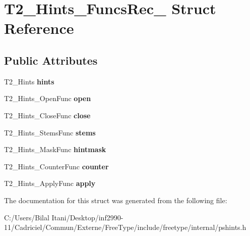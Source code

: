 \hypertarget{struct_t2___hints___funcs_rec__}{}\section{T2\+\_\+\+Hints\+\_\+\+Funcs\+Rec\+\_\+ Struct Reference}
\label{struct_t2___hints___funcs_rec__}
\subsection*{Public Attributes}
\begin{DoxyCompactItemize}
\item 
T2\+\_\+\+Hints {\bfseries hints}\hypertarget{struct_t2___hints___funcs_rec___af8daab694889bede5a513fbae5f86e25}{}\label{struct_t2___hints___funcs_rec___af8daab694889bede5a513fbae5f86e25}

\item 
T2\+\_\+\+Hints\+\_\+\+Open\+Func {\bfseries open}\hypertarget{struct_t2___hints___funcs_rec___a1a5e0b296ee2e2ae6711b3ee35e5fcd9}{}\label{struct_t2___hints___funcs_rec___a1a5e0b296ee2e2ae6711b3ee35e5fcd9}

\item 
T2\+\_\+\+Hints\+\_\+\+Close\+Func {\bfseries close}\hypertarget{struct_t2___hints___funcs_rec___a7e50e26fd55254044bc9f2ba62574352}{}\label{struct_t2___hints___funcs_rec___a7e50e26fd55254044bc9f2ba62574352}

\item 
T2\+\_\+\+Hints\+\_\+\+Stems\+Func {\bfseries stems}\hypertarget{struct_t2___hints___funcs_rec___a12bfd8bae5d3df8f570fcdfb70c00139}{}\label{struct_t2___hints___funcs_rec___a12bfd8bae5d3df8f570fcdfb70c00139}

\item 
T2\+\_\+\+Hints\+\_\+\+Mask\+Func {\bfseries hintmask}\hypertarget{struct_t2___hints___funcs_rec___af50d0cadda7033d7dbd27a199ccfcdd4}{}\label{struct_t2___hints___funcs_rec___af50d0cadda7033d7dbd27a199ccfcdd4}

\item 
T2\+\_\+\+Hints\+\_\+\+Counter\+Func {\bfseries counter}\hypertarget{struct_t2___hints___funcs_rec___ad9d856a64b4a8556fc8d74bae1779e11}{}\label{struct_t2___hints___funcs_rec___ad9d856a64b4a8556fc8d74bae1779e11}

\item 
T2\+\_\+\+Hints\+\_\+\+Apply\+Func {\bfseries apply}\hypertarget{struct_t2___hints___funcs_rec___abaf12efb416bd79cf4ce72b13e6fc68f}{}\label{struct_t2___hints___funcs_rec___abaf12efb416bd79cf4ce72b13e6fc68f}

\end{DoxyCompactItemize}


The documentation for this struct was generated from the following file\+:\begin{DoxyCompactItemize}
\item 
C\+:/\+Users/\+Bilal Itani/\+Desktop/inf2990-\/11/\+Cadriciel/\+Commun/\+Externe/\+Free\+Type/include/freetype/internal/pshints.\+h\end{DoxyCompactItemize}
